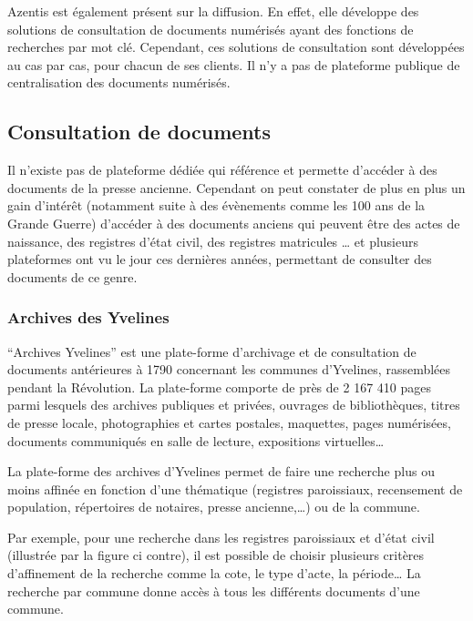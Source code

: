         Azentis est également présent sur la diffusion. En effet, elle développe des solutions de consultation de documents numérisés ayant des fonctions de recherches par mot clé. Cependant, ces solutions de consultation sont développées au cas par cas, pour chacun de ses clients. Il n'y a pas de plateforme publique de centralisation des documents numérisés.

    \subsection{Consultation de documents}
    \label{subsec:consultation}
    Il n’existe pas de plateforme dédiée qui référence et permette d’accéder à des documents de la presse ancienne. Cependant on peut constater de plus en plus un gain d’intérêt (notamment suite à des évènements comme les 100 ans de la Grande Guerre) d’accéder à des documents anciens qui peuvent être des actes de naissance, des registres d’état civil, des registres matricules … et plusieurs plateformes ont vu le jour ces dernières années, permettant de consulter des documents de ce genre.


        \subsubsection{Archives des Yvelines}
        \label{subsubsec:yvelines}
        “Archives Yvelines” est une plate-forme d’archivage et de consultation de documents antérieures à 1790 concernant les communes d’Yvelines, rassemblées pendant la Révolution. La plate-forme comporte de près de 2 167 410 pages parmi lesquels  des archives publiques et privées, ouvrages de bibliothèques, titres de presse locale, photographies et cartes postales, maquettes, pages numérisées, documents communiqués en salle de lecture, expositions virtuelles…

        La plate-forme des archives d’Yvelines permet de faire une recherche plus ou moins affinée en fonction d’une thématique (registres paroissiaux, recensement de population, répertoires de notaires, presse ancienne,…) ou de la commune. 

        Par exemple, pour une recherche dans les registres paroissiaux et d’état civil (illustrée par la figure ci contre), il est possible de choisir plusieurs critères d’affinement de la recherche comme la cote, le type d’acte, la période… La recherche par commune donne accès à tous les différents documents d’une commune.

